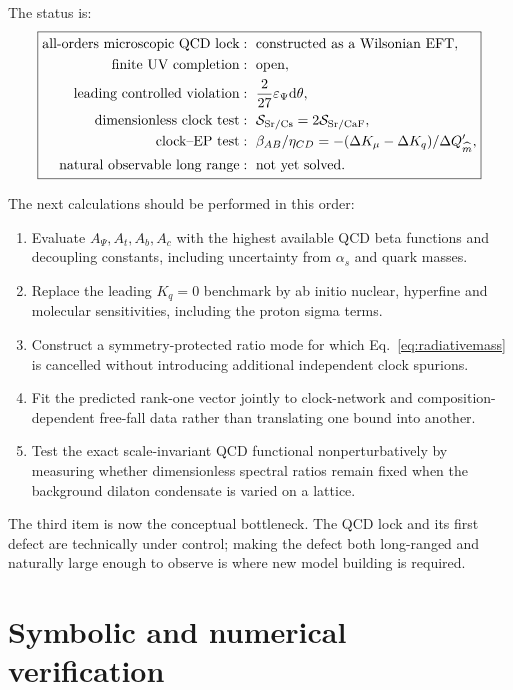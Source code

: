 \documentclass[11pt,a4paper]{article}
\newcommand{\dd}{\mathrm{d}}
\begin{document}
The status is:
\[
\boxed{
\begin{aligned}
\text{all-orders microscopic QCD lock}
&:\ \text{constructed as a Wilsonian EFT},\\
\text{finite UV completion}
&:\ \text{open},\\
\text{leading controlled violation}
&:\ \frac{2}{27}\varepsilon_\Psi\dd\theta,\\
\text{dimensionless clock test}
&:\ \mathcal S_{\rm Sr/Cs}=2\mathcal S_{\rm Sr/CaF},\\
\text{clock--EP test}
&:\ \beta_{AB}/\eta_{CD}
=-(\Delta K_\mu-\Delta K_q)/\Delta Q'_{\widehat m},\\
\text{natural observable long range}
&:\ \text{not yet solved}.
\end{aligned}}
\]

The next calculations should be performed in this order:

\begin{enumerate}
  \item Evaluate $A_\Psi,A_t,A_b,A_c$ with the highest available QCD beta functions and decoupling constants, including uncertainty from $\alpha_s$ and quark masses.
  \item Replace the leading $K_q=0$ benchmark by ab initio nuclear, hyperfine and molecular sensitivities, including the proton sigma terms.
  \item Construct a symmetry-protected ratio mode for which Eq.~\eqref{eq:radiativemass} is cancelled without introducing additional independent clock spurions.
  \item Fit the predicted rank-one vector jointly to clock-network and composition-dependent free-fall data rather than translating one bound into another.
  \item Test the exact scale-invariant QCD functional nonperturbatively by measuring whether dimensionless spectral ratios remain fixed when the background dilaton condensate is varied on a lattice.
\end{enumerate}

The third item is now the conceptual bottleneck. The QCD lock and its first defect are technically under control; making the defect both long-ranged and naturally large enough to observe is where new model building is required.

\appendix

\section{Symbolic and numerical verification}
\end{document}
